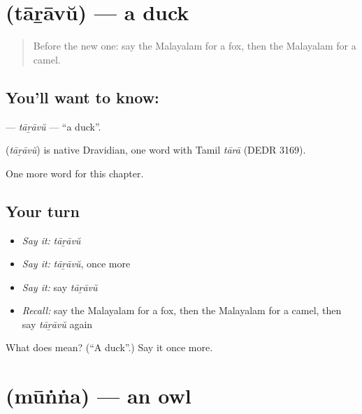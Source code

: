 \section[\texorpdfstring{\ml{താറാവ്} (tāṟāvŭ)}{താറാവ് (tāṟāvŭ)}]{ (tāṟāvŭ) — a duck}

\label{lesson:ML-C162-taravu}



\begin{quote}
Before the new one: say the Malayalam for a fox, then the Malayalam for a camel.
\end{quote}

\subsection*{You'll want to know: }
\textbf{} — \emph{tāṟāvŭ} — \textquotedblleft{}a duck\textquotedblright{}.

\begin{cousinweb}
\textbf{} (\emph{tāṟāvŭ}) is native Dravidian, one word with Tamil \emph{tārā} (DEDR 3169).
\end{cousinweb}

\begin{grammarlens}[title={What you've built}]
One more word for this chapter.
\end{grammarlens}

\subsection*{Your turn}
\begin{itemize}
\raggedright
  \item \emph{Say it:} \emph{tāṟāvŭ}
  \item \emph{Say it:} \emph{tāṟāvŭ}, once more
  \item \emph{Say it:} say \emph{tāṟāvŭ}
  \item \emph{Recall:} say the Malayalam for a fox, then the Malayalam for a camel, then say \emph{tāṟāvŭ} again
\end{itemize}

\begin{tcolorbox}[breakable,colback=teal!4,colframe=teal!35!black,title={Before you move on}]
What does  mean? (\textquotedblleft{}A duck\textquotedblright{}.) Say it once more.
\end{tcolorbox}
\section[\texorpdfstring{\ml{മൂങ്ങ} (mūṅṅa)}{മൂങ്ങ (mūṅṅa)}]{ (mūṅṅa) — an owl}

